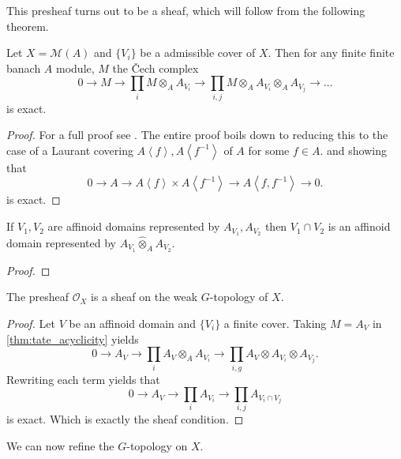 This presheaf turns out to be a sheaf, which will follow from the following theorem. 
\begin{theorem}\label{thm:tate_acyclicity}
	Let $X = \mathcal{M} (A)$ and $\{V_i\} $ be a admissible cover of $X$. 
	Then for any finite finite banach $A$ module, $M$ the Čech complex \[
		0 \to M \to \prod_{i} M \otimes_A A_{V_i} \to \prod_{i, j} M \otimes_A A_{V_i} \otimes_A A_{V_j} \to \ldots
	\] 
	is exact. 
\end{theorem}
\begin{proof}
	For a full proof see \cite[][prop.\ 2.2.5]{berkovichSpectralTheoryAnalytic2012}. 
	The entire proof boils down to reducing this to the case of a Laurant covering $A\left<f \right>, A\left<f^{-1} \right>$ of $A$ for some $f \in A$. and showing that \[
		0 \to A \to A\left<f \right>\times  A\left<f^{-1} \right> \to A\left<f, f^{-1} \right> \to 0
	.\]  
	is exact. 
\end{proof}

\begin{lemma}
	If $V_1, V_2$ are affinoid domains represented by $A_{V_1}, A_{V_2}$ then $V_1 \cap V_2$ is an affinoid domain represented by $A_{V_1} \widehat\otimes_A A_{V_2}$. 
\end{lemma}
\begin{proof}
\end{proof}

\begin{corollary}
	The presheaf $\mathcal{O}_X$ is a sheaf on the weak $G$-topology of $X$.
\end{corollary}
\begin{proof}
	Let $V$ be an affinoid domain and $\{V_i\} $ a finite cover. 
	Taking $M = A_V$ in \cref{thm:tate_acyclicity} yields \[
	0 \to A_V \to \prod_{i } A_V \otimes_A A_{V_i} \to \prod_{i,g} A_V \otimes A_{V_i} \otimes A_{V_j}
	.\] 
	Rewriting each term yields that \[
	0 \to A_V \to \prod_i A_{V_i} \to \prod_{i, j} A_{V_i \cap V_j}
	\] 
	is exact. Which is exactly the sheaf condition. 
\end{proof}

We can now refine the $G$-topology on $X$. 




